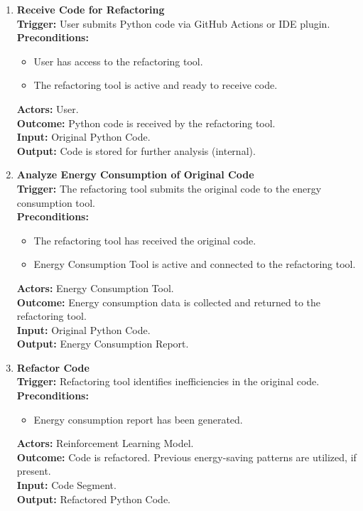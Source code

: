 \documentclass[12pt]{article}
\begin{document}
\setlength{\parindent}{0pt}
\begin{enumerate}[label={\bf PUC \arabic*:}, wide=0pt, font=\itshape]
\item {\bf Receive Code for Refactoring} \\[2mm]
\textbf{Trigger:} User submits Python code via GitHub Actions or IDE plugin. \\[2mm]
\textbf{Preconditions:}
\begin{itemize}
    \item User has access to the refactoring tool.
    \item The refactoring tool is active and ready to receive code.
\end{itemize}
\textbf{Actors:} User. \\
\textbf{Outcome:} Python code is received by the refactoring tool. \\
\textbf{Input:} Original Python Code. \\
\textbf{Output:} Code is stored for further analysis (internal).

\item \textbf{Analyze Energy Consumption of Original Code} \\[2mm]
\textbf{Trigger:} The refactoring tool submits the original code to the energy consumption tool. \\[2mm]
\textbf{Preconditions:}
\begin{itemize}
    \item The refactoring tool has received the original code.
    \item Energy Consumption Tool is active and connected to the refactoring tool.
\end{itemize}
\textbf{Actors:} Energy Consumption Tool. \\
\textbf{Outcome:} Energy consumption data is collected and returned to the refactoring tool. \\
\textbf{Input:} Original Python Code. \\
\textbf{Output:} Energy Consumption Report.

\item \textbf{Refactor Code} \\[2mm]
\textbf{Trigger:} Refactoring tool identifies inefficiencies in the original code. \\[2mm]
\textbf{Preconditions:}
\begin{itemize}
    \item Energy consumption report has been generated.
\end{itemize}
\textbf{Actors:} Reinforcement Learning Model. \\
\textbf{Outcome:} Code is refactored. Previous energy-saving patterns are utilized, if present. \\
\textbf{Input:} Code Segment. \\
\textbf{Output:} Refactored Python Code.


\end{enumerate}
\end{document}
